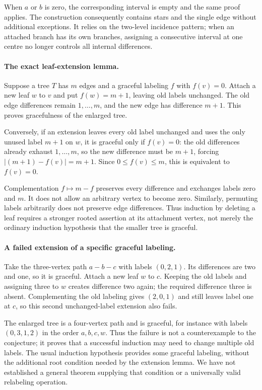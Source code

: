 \documentclass[11pt,a4paper]{article}
\begin{document}
When $a$ or $b$ is zero, the corresponding interval is empty and the same proof applies. The construction consequently contains stars and the single edge without additional exceptions. It relies on the two-level incidence pattern; when an attached branch has its own branches, assigning a consecutive interval at one centre no longer controls all internal differences.

\paragraph{The exact leaf-extension lemma.}
Suppose a tree $T$ has $m$ edges and a graceful labeling $f$ with $f(v)=0$. Attach a new leaf $w$ to $v$ and put $f(w)=m+1$, leaving old labels unchanged. The old edge differences remain $1,\ldots,m$, and the new edge has difference $m+1$. This proves gracefulness of the enlarged tree.

Conversely, if an extension leaves every old label unchanged and uses the only unused label $m+1$ on $w$, it is graceful only if $f(v)=0$: the old differences already exhaust $1,\ldots,m$, so the new difference must be $m+1$, forcing $|(m+1)-f(v)|=m+1$. Since $0\le f(v)\le m$, this is equivalent to $f(v)=0$.

Complementation $f\mapsto m-f$ preserves every difference and exchanges labels zero and $m$. It does not allow an arbitrary vertex to become zero. Similarly, permuting labels arbitrarily does not preserve edge differences. Thus induction by deleting a leaf requires a stronger rooted assertion at its attachment vertex, not merely the ordinary induction hypothesis that the smaller tree is graceful.

\paragraph{A failed extension of a specific graceful labeling.}
Take the three-vertex path $a-b-c$ with labels $(0,2,1)$. Its differences are two and one, so it is graceful. Attach a new leaf $w$ to $c$. Keeping the old labels and assigning three to $w$ creates difference two again; the required difference three is absent. Complementing the old labeling gives $(2,0,1)$ and still leaves label one at $c$, so this second unchanged-label extension also fails.

The enlarged tree is a four-vertex path and is graceful, for instance with labels $(0,3,1,2)$ in the order $a,b,c,w$. Thus the failure is not a counterexample to the conjecture; it proves that a successful induction may need to change multiple old labels. The usual induction hypothesis provides some graceful labeling, without the additional root condition needed by the extension lemma. We have not established a general theorem supplying that condition or a universally valid relabeling operation.
\end{document}
